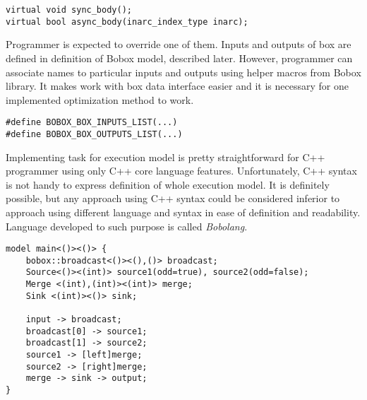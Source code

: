 \begin{lstlisting}[caption={Code representation of box action step.}]
virtual void sync_body();
virtual bool async_body(inarc_index_type inarc);
\end{lstlisting}

Programmer is expected to override one of them. Inputs and outputs of box are defined in definition of Bobox model, described later. However, programmer can associate names to particular inputs and outputs using helper macros from Bobox library. It makes work with box data interface easier and it is necessary for one implemented optimization method to work.

\begin{lstlisting}[caption={Mapping of box input and output to \textit{names}.}]
#define BOBOX_BOX_INPUTS_LIST(...)
#define BOBOX_BOX_OUTPUTS_LIST(...)
\end{lstlisting}

Implementing task for execution model is pretty straightforward for C++ programmer using only C++ core language features. Unfortunately, C++ syntax is not handy to express definition of whole execution model. It is definitely possible, but any approach using C++ syntax could be considered inferior to approach using different language and syntax in ease of definition and readability. Language developed to such purpose is called \emph{Bobolang}.

\begin{lstlisting}[caption={Example of Bobolang usage from Bobox project.}]
model main<()><()> {
	bobox::broadcast<()><(),()> broadcast;
	Source<()><(int)> source1(odd=true), source2(odd=false);
	Merge <(int),(int)><(int)> merge;
	Sink <(int)><()> sink;
	
	input -> broadcast;
	broadcast[0] -> source1;
	broadcast[1] -> source2;
	source1 -> [left]merge;
	source2 -> [right]merge;
	merge -> sink -> output;
}
\end{lstlisting}
